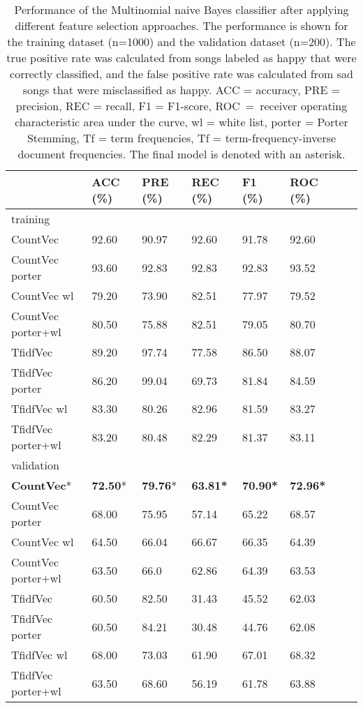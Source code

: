 \documentclass{article}
\begin{document}
\begin{table}[h]
  \caption{Performance of the Multinomial naive Bayes classifier after applying different feature selection approaches. The performance is shown for the training dataset (n=1000) and the validation dataset (n=200). The true positive rate was calculated from songs labeled as happy that were correctly classified, and the false positive rate was calculated from sad songs that were misclassified as happy. ACC = accuracy, PRE = precision, REC = recall, F1 = F1-score, \mbox{ROC = }receiver operating characteristic area under the curve, wl = white list, porter = Porter Stemming, Tf = term frequencies, Tf = term-frequency-inverse document frequencies. The final model is denoted with an asterisk.}
  
  \begin{tabular}[t]{| l  | l || l | l | l | l | l  |l |}
   \hline
     & ACC (\%) & PRE (\%) &  REC (\%) & F1 (\%) & ROC (\%)\\
   \hline
   \hline
training  \\
\hline
CountVec           & 92.60     & 90.97    & 92.60     & 91.78   & 92.60         \\
CountVec porter    & 93.60     & 92.83    & 92.83    & 92.83   & 93.52        \\
CountVec wl        & 79.20     & 73.90     & 82.51    & 77.97   & 79.52        \\
CountVec porter+wl & 80.50     & 75.88    & 82.51    & 79.05   & 80.70         \\
TfidfVec           & 89.20     & 97.74    & 77.58    & 86.50    & 88.07        \\
TfidfVec porter    & 86.20    & 99.04    & 69.73    & 81.84   & 84.59        \\
TfidfVec wl        & 83.30    & 80.26    & 82.96    & 81.59   & 83.27        \\
TfidfVec porter+wl & 83.20     & 80.48    & 82.29    & 81.37   & 83.11        \\
\hline 
validation  \\
\hline 
\textbf{CountVec}*               & \textbf{72.50}*     & \textbf{79.76}*    & \textbf{63.81*}    & \textbf{70.90*}    & \textbf{72.96*}        \\
CountVec porter        & 68.00     & 75.95    & 57.14    & 65.22   & 68.57        \\
CountVec wl            & 64.50     & 66.04    & 66.67    & 66.35   & 64.39        \\
CountVec porter+wl     & 63.50    & 66.0     & 62.86    & 64.39   & 63.53        \\
TfidfVec               & 60.50     & 82.50     & 31.43    & 45.52   & 62.03        \\
TfidfVec porter        & 60.50    & 84.21    & 30.48    & 44.76   & 62.08        \\
TfidfVec wl            & 68.00     & 73.03    & 61.90     & 67.01   & 68.32        \\
TfidfVec porter+wl     & 63.50     & 68.60     & 56.19    & 61.78   & 63.88       \\
   \hline
  \end{tabular}
\end{table}
\end{document}
